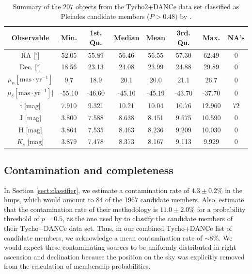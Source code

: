 \begin{table}[ht!]
\caption{Summary of the 207 objects from the Tycho2+DANCe data set classified as Pleiades candidate members ($P>0.48)$ by \citet{Bouy2015}.}
\begin{center}
\begin{tabular}{|c|c|c|c|c|c|c|c|}
\hline
Observable & Min. & 1st. Qu. & Median & Mean & 3rd. Qu. & Max. & NA's \\
\hline
\hline
RA [$^\circ$]                                 				            &  52.05&55.89 & 56.46 &56.55  &57.30   &  62.49  & 0\\
Dec. [$^\circ$]                       					           &  18.56&23.13  & 24.08& 23.99  &24.88  & 29.89 &0\\
$\mu_{\alpha} [\mathrm{mas}\cdot \mathrm{yr}^{-1}]$   &      9.7 &18.9   & 20.1  &    20.0 &  21.1   &  26.7&0\\
$\mu_{\delta} [\mathrm{mas}\cdot \mathrm{yr}^{-1}]]$   &  -55.10&-46.60&-45.10&-45.19 &-43.70  & -37.70&0\\
i [mag]								            &   7.910&9.321 & 10.21&  10.04 &   10.76& 12.960&   72\\
J [mag]          								    &   3.800& 7.588& 8.638& 8.451 & 9.575  &10.590&      0\\
H [mag]        								    &   3.864& 7.535& 8.463& 8.236 & 9.209  & 10.030&      0 \\
$K_s$ [mag]  							            &   3.879&7.478 & 8.373& 8.167  &  9.113 &  9.929&    0\\
\hline
\end{tabular}
\end{center}
\label{tab:tycho2}
\end{table}%

\subsection{Contamination and completeness}
\label{sect:TDContamination}
In Section \ref{sect:classifier}, we estimate a contamination rate of $4.3\pm0.2$\% in the \gls{hmps}, which
would amount to 84 of the 1967 candidate members. Also, \citet{Sarro2014} estimate that the contamination rate of their methodology is $11.0\pm2.0$\% for a probability threshold of $p=0.5$, as the one used by \citet{Bouy2015} to classify the candidate members of their Tycho+DANCe data set.  Thus, in our combined Tycho+DANCe list of candidate members, we acknowledge a mean contamination rate of $\sim 8\%$. We would expect these contaminating sources to be uniformly distributed in right ascension and declination because the position on the sky was explicitly removed from the calculation of membership probabilities.

